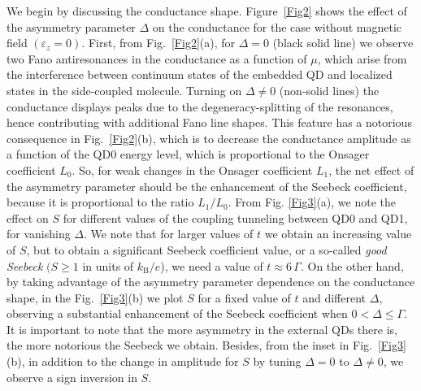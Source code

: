 \documentclass[aps,twocolumn,prb,superscript,floatfix,superscriptaddress,showpacs]{revtex4-1}
\newcommand{\ve}{\varepsilon}
\begin{document}
We begin by discussing the conductance shape. Figure\ \ref{Fig2} shows the effect of the asymmetry parameter $\Delta$ on the conductance for the case without magnetic field $(\ve_{z}=0)$. First, from Fig.\ \ref{Fig2}(a), for $\Delta=0$ (black solid line) we observe two Fano antiresonances in the conductance as a function of $\mu$, which arise from the interference between continuum states of the embedded QD and localized states in the side-coupled molecule. Turning on $\Delta\neq0$ (non-solid lines) the conductance displays peaks due to the degeneracy-splitting of the resonances, hence contributing with additional Fano line shapes. This feature has a notorious consequence in Fig.\ \ref{Fig2}(b), which is to decrease the conductance amplitude as a function of the QD0 energy level, which is proportional to the Onsager coefficient $L_{0}$. So, for weak changes in the Onsager coefficient $L_{1}$, the net effect of the asymmetry parameter should be the enhancement of the Seebeck coefficient, because it is proportional to the ratio $L_{1}/L_{0}$. From Fig. \ref{Fig3}(a), we note the effect on $S$ for different values of the coupling tunneling  between QD0 and QD1, for vanishing $\Delta$. We note that for larger values of $t$ we obtain an increasing value of $S$, but to obtain a significant Seebeck coefficient value, or a so-called \emph{good Seebeck}\cite{Gabi2015,Chen2012,isern2016} $(S\geq 1$ in units of $k_{\text{B}}/e$), we need a value of $t\approx 6\,\Gamma$. On the other hand, by taking advantage of the asymmetry parameter dependence on the conductance shape, in the Fig.\ \ref{Fig3}(b) we plot $S$ for a fixed value of $t$ and different $\Delta$, observing a substantial enhancement of the Seebeck coefficient when $0<\Delta\leq\Gamma$. It is important to note that the more asymmetry in the external QDs there is, the more notorious the Seebeck we obtain. Besides, from the inset in Fig.\ \ref{Fig3}(b), in addition to the change in amplitude for $S$ by tuning $\Delta=0$ to $\Delta\neq 0$, we observe a sign inversion in $S$.
\end{document}
